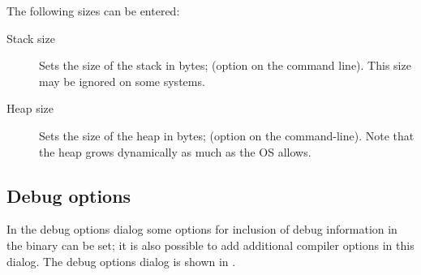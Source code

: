
The following sizes can be entered:
\begin{description}
\item[Stack size] Sets the size of the stack in bytes; 
(option  on the command line). This size may be ignored on some
systems.
\item[Heap size] Sets the size of the heap in bytes; (option  on
the command-line). Note that the heap grows dynamically as much as the OS
allows.
\end{description}

%
%
\subsection{Debug options}
\label{se:debugoptions}
In the debug options dialog some options for inclusion of debug information
in the binary can be set; it is also possible to add additional compiler
options in this dialog.
The debug options dialog is shown in .


